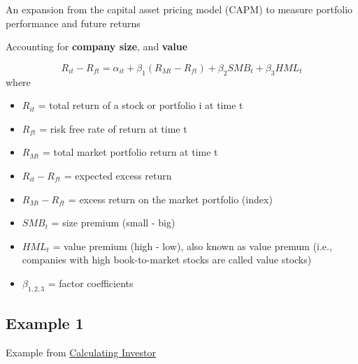 \documentclass[
]{book}
\providecommand{\tightlist}{%
  \setlength{\itemsep}{0pt}\setlength{\parskip}{0pt}}
\begin{document}
\citep{Fama_1993}

An expansion from the capital asset pricing model (CAPM) to measure portfolio performance and future returns

Accounting for \textbf{company size}, and \textbf{value}

\[
R_{it} - R_{ft} = \alpha_{it} + \beta_1 (R_{Mt} - R_{ft}) + \beta_2 SMB_t + \beta_3 HML_t
\] where

\begin{itemize}
\tightlist
\item
  \(R_{it}\) = total return of a stock or portfolio i at time t
\item
  \(R_{ft}\) = risk free rate of return at time t
\item
  \(R_{Mt}\) = total market portfolio return at time t
\item
  \(R_{it} - R_{ft}\) = expected excess return
\item
  \(R_{Mt} - R_{ft}\) = excess return on the market portfolio (index)
\item
  \(SMB_t\) = size premium (small - big)
\item
  \(HML_t\) = value premium (high - low), also known as value premum (i.e., companies with high book-to-market stocks
  are called value stocks)
\item
  \(\beta_{1,2,3}\) = factor coefficients
\end{itemize}

\hypertarget{example-1}{%
\subsection{Example 1}\label{example-1}}

Example from \href{http://www.calculatinginvestor.com/2011/04/19/fama-french-tutorial/}{Calculating Investor}
\end{document}
